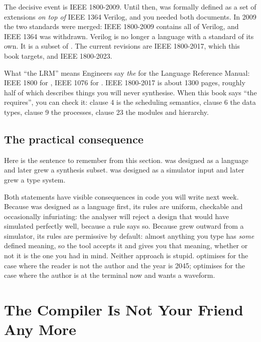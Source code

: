 The decisive event is IEEE 1800-2009. Until then, \SV{} was formally defined as
a set of extensions \emph{on top of} IEEE 1364 Verilog, and you needed both
documents. In 2009 the two standards were merged: IEEE 1800-2009 contains all
of Verilog, and IEEE 1364 was withdrawn. Verilog is no longer a language with a
standard of its own. It is a subset of \SV{}. The current revisions are IEEE
1800-2017, which this book targets, and IEEE 1800-2023.

\begin{notebox}{What ``the LRM'' means}
Engineers say \emph{the \LRM{}} for the Language Reference Manual: IEEE 1800 for
\SV{}, IEEE 1076 for \VHDL{}. IEEE 1800-2017 is about 1300 pages, roughly half
of which describes things you will never synthesise. When this book says ``the
\LRM{} requires'', you can check it: clause 4 is the scheduling semantics,
clause 6 the data types, clause 9 the processes, clause 23 the modules and
hierarchy.
\end{notebox}

\subsection{The practical consequence}

Here is the sentence to remember from this section. \VHDL{} was designed as a
language and later grew a synthesis subset. \SV{} was designed as a simulator
input and later grew a type system.

Both statements have visible consequences in code you will write next week.
Because \VHDL{} was designed as a language first, its rules are uniform,
checkable and occasionally infuriating: the analyser will reject a design that
would have simulated perfectly well, because a rule says so. Because \SV{} grew
outward from a simulator, its rules are permissive by default: almost anything
you type has \emph{some} defined meaning, so the tool accepts it and gives you
that meaning, whether or not it is the one you had in mind. Neither approach is
stupid. \VHDL{} optimises for the case where the reader is not the author and
the year is 2045; \SV{} optimises for the case where the author is at the
terminal now and wants a waveform.

\section{The Compiler Is Not Your Friend Any More}
\label{sec:philosophy:typing}

